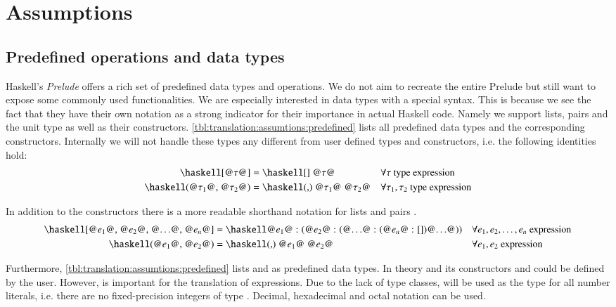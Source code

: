 \section{Assumptions} \label{sec:translation:assumtions}
\subsection{Predefined operations and data types}
Haskell's \textit{Prelude} offers a rich set of predefined data types and operations.
We do not aim to recreate the entire Prelude but still want to expose some commonly used functionalities.
We are especially interested in data types with a special syntax.
This is because we see the fact that they have their own notation as a strong indicator for their importance in actual Haskell code.
Namely we support lists, pairs and the unit type as well as their constructors.
\autoref{tbl:translation:assumtions:predefined} lists all predefined data types and the corresponding constructors.
Internally we will not handle these types any different from user defined types and constructors, i.e. the following identities hold:
\begin{align*}
  \haskellM{[@$\tau$@]}
  &= \haskellM{[] @$\tau$@}
  &&\forall \tau \text{ type expression}
  \\
  \haskellM{(@$\tau_1$@, @$\tau_2$@)}
  &= \haskellM{(,) @$\tau_1$@ @$\tau_2$@}
  &&\forall \tau_1, \tau_2 \text{ type expression}
\end{align*}

In addition to the constructors there is a more readable shorthand notation for lists and pairs \cite[pp.~20-21]{Marlow:2010}.
\begin{align}
  \haskellM{[@$e_1$@, @$e_2$@, @$\ldots$@, @$e_n$@]}
  &= \haskellM{@$e_1$@ : (@$e_2$@ : (@$\ldots$@ : (@$e_n$@ : [])@$\ldots$@))}
  &&\forall e_1, e_2, \ldots, e_n \text{ expression}
  \label{eqn:translation:assumtions:list-literal}
  \\
  \haskellM{(@$e_1$@, @$e_2$@)}
  &= \haskellM{(,) @$e_1$@ @$e_2$@}
  &&\forall e_1, e_2 \text{ expression}
  \label{eqn:translation:assumtions:pair-literal}
\end{align}

Furthermore, \autoref{tbl:translation:assumtions:predefined} lists  and  as predefined data types.
In theory  and its constructors  and  could be defined by the user.
However,  is important for the translation of  expressions.
Due to the lack of type classes,  will be used as the type for all number literals, i.e. there are no fixed-precision integers of type .
Decimal, hexadecimal and octal notation can be used.

